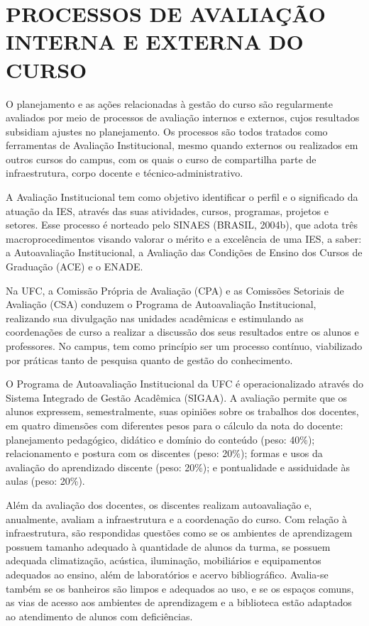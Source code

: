 \chapter{PROCESSOS DE AVALIAÇÃO INTERNA E EXTERNA DO CURSO}
\label{cap:processos-de-avaliacao-interna}

O planejamento e as ações relacionadas à gestão do curso são regularmente avaliados por meio de processos de avaliação internos e externos, cujos resultados subsidiam ajustes no planejamento. Os processos são todos tratados como ferramentas de Avaliação Institucional, mesmo quando externos ou realizados em outros cursos do campus, com os quais o curso de \nomedocurso compartilha parte de infraestrutura, corpo docente e técnico-administrativo.

A Avaliação Institucional tem como objetivo identificar o perfil e o significado da atuação da IES, através das suas atividades, cursos, programas, projetos e setores. Esse processo é norteado pelo SINAES (BRASIL, 2004b), que adota três macroprocedimentos visando valorar o mérito e a excelência de uma IES, a saber: a Autoavaliação Institucional, a Avaliação das Condições de Ensino dos Cursos de Graduação (ACE) e o ENADE.

Na UFC, a Comissão Própria de Avaliação (CPA) e as Comissões Setoriais de Avaliação (CSA) conduzem o Programa de Autoavaliação Institucional, realizando sua divulgação nas unidades acadêmicas e estimulando as coordenações de curso a realizar a discussão dos seus resultados entre os alunos e professores. No campus, tem como princípio ser um processo contínuo, viabilizado por práticas tanto de pesquisa quanto de gestão do conhecimento.

O Programa de Autoavaliação Institucional da UFC é operacionalizado através do Sistema Integrado de Gestão Acadêmica (SIGAA). A avaliação permite que os alunos expressem, semestralmente, suas opiniões sobre os trabalhos dos docentes, em quatro dimensões com diferentes pesos para o cálculo da nota do docente: planejamento pedagógico, didático e domínio do conteúdo (peso: 40\%); relacionamento e postura com os discentes (peso: 20\%); formas e usos da avaliação do aprendizado discente (peso: 20\%); e pontualidade e assiduidade às aulas (peso: 20\%).

Além da avaliação dos docentes, os discentes realizam autoavaliação e, anualmente, avaliam a infraestrutura e a coordenação do curso. Com relação à infraestrutura, são respondidas questões como se os ambientes de aprendizagem possuem tamanho adequado à quantidade de alunos da turma, se possuem adequada climatização, acústica, iluminação, mobiliários e equipamentos adequados ao ensino, além de laboratórios e acervo bibliográfico. Avalia-se também se os banheiros são limpos e adequados ao uso, e se os espaços comuns, as vias de acesso aos ambientes de aprendizagem e a biblioteca estão adaptados ao atendimento de alunos com deficiências.

